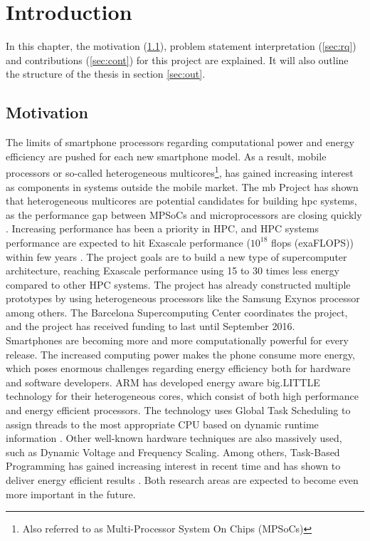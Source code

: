 \chapter{Introduction}
In this chapter, the motivation (\ref{sec:mot}), problem statement interpretation (\ref{sec:rq}) and contributions (\ref{sec:cont}) for this project are explained. It will also outline the structure of the thesis in section \ref{sec:out}.

\section{Motivation}
\label{sec:mot}
The limits of smartphone processors regarding computational power and energy efficiency are pushed for each new smartphone model. As a result, mobile processors or so-called heterogeneous multicores\footnote{Also referred to as Multi-Processor System On Chips (MPSoCs)}, has gained increasing interest as components in systems outside the mobile market. The \gls{mb} Project \cite{MB} has shown that heterogeneous multicores are potential candidates for building \gls{hpc} systems, as the performance gap between MPSoCs and microprocessors are closing quickly \cite{a:MB:Raj13}. Increasing performance has been a priority in HPC, and HPC systems performance are expected to hit Exascale performance ($10^{18}$ \gls{flops} (exaFLOPS)) within few years \cite{TOP500}. The project goals are to build a new type of supercomputer architecture, reaching Exascale performance using 15 to 30 times less energy compared to other HPC systems. The project has already constructed multiple prototypes by using heterogeneous processors like the Samsung Exynos \cite{EXY} processor among others. The Barcelona Supercomputing Center coordinates the project, and the project has received funding to last until September 2016. \\

Smartphones are becoming more and more computationally powerful for every release. The increased computing power makes the phone consume more energy, which poses enormous challenges regarding energy efficiency both for hardware and software developers. ARM has developed energy aware big.LITTLE technology for their heterogeneous cores, which consist of both high performance and energy efficient processors. The technology uses Global Task Scheduling to assign threads to the most appropriate CPU based on dynamic runtime information \cite{a:ARM:bL}. Other well-known hardware techniques are also massively used, such as Dynamic Voltage and Frequency Scaling. Among others, Task-Based Programming has gained increasing interest in recent time and has shown to deliver energy efficient results \cite{a:Lien2012}. Both research areas are expected to become even more important in the future. \\

